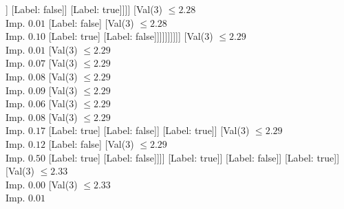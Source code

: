 \documentclass[margin=10pt]{standalone}
\begin{document}
\begin{forest}
														[Label: true]
														[Val($3$) $ \leq 2.27$ \\ Imp. $0.01$
															[Label: false]
															[Val($3$) $ \leq 2.27$ \\ Imp. $0.03$
																[Label: true]
																[Val($3$) $ \leq 2.28$ \\ Imp. $0.01$
																	[Val($3$) $ \leq 2.27$ \\ Imp. $0.10$
																		[Label: false]
																		[Val($3$) $ \leq 2.27$ \\ Imp. $0.08$
																			[Label: true]
																			[Val($3$) $ \leq 2.28$ \\ Imp. $0.11$
																				[Val($3$) $ \leq 2.28$ \\ Imp. $0.12$
																					[Val($3$) $ \leq 2.27$ \\ Imp. $0.50$
																						[Label: false]
																						[Label: true]]
																					[Label: false]]
																				[Label: true]]]]
																	[Val($3$) $ \leq 2.28$ \\ Imp. $0.01$
																		[Label: false]
																		[Val($3$) $ \leq 2.28$ \\ Imp. $0.10$
																			[Label: true]
																			[Label: false]]]]]]]]]]
										[Val($3$) $ \leq 2.29$ \\ Imp. $0.01$
											[Val($3$) $ \leq 2.29$ \\ Imp. $0.07$
												[Val($3$) $ \leq 2.29$ \\ Imp. $0.08$
													[Val($3$) $ \leq 2.29$ \\ Imp. $0.09$
														[Val($3$) $ \leq 2.29$ \\ Imp. $0.06$
															[Val($3$) $ \leq 2.29$ \\ Imp. $0.08$
																[Val($3$) $ \leq 2.29$ \\ Imp. $0.17$
																	[Label: true]
																	[Label: false]]
																[Label: true]]
															[Val($3$) $ \leq 2.29$ \\ Imp. $0.12$
																[Label: false]
																[Val($3$) $ \leq 2.29$ \\ Imp. $0.50$
																	[Label: true]
																	[Label: false]]]]
														[Label: true]]
													[Label: false]]
												[Label: true]]
											[Val($3$) $ \leq 2.33$ \\ Imp. $0.00$
												[Val($3$) $ \leq 2.33$ \\ Imp. $0.01$

\end{forest}
\end{document}
